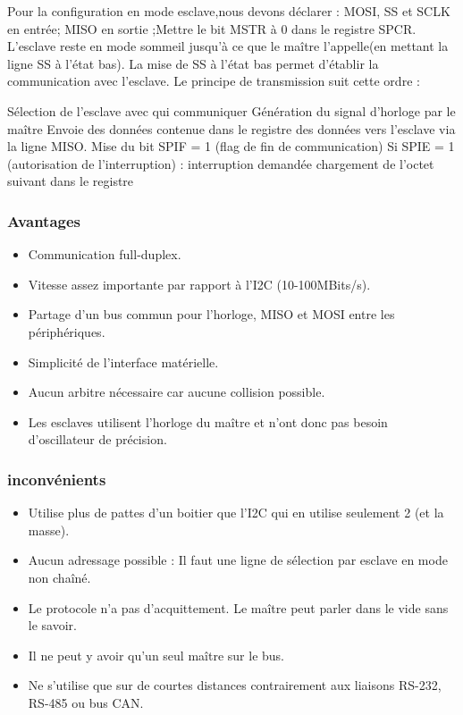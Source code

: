 \documentclass[french,a4paper,12pt]{report}
\begin{document}
  		Pour la configuration en mode esclave,nous devons déclarer : MOSI, SS et SCLK en entrée; MISO en sortie ;Mettre le bit MSTR à 0 dans le registre SPCR. L’esclave reste en mode sommeil jusqu’à ce que le maître l'appelle(en mettant la ligne SS à l’état bas). La mise de SS à l’état bas permet d'établir la communication avec l’esclave. Le principe de transmission suit cette ordre :
 
    Sélection de l'esclave avec qui communiquer
    Génération du signal d'horloge par le maître
    Envoie des données contenue dans le registre des données vers l’esclave via la ligne MISO.
    Mise du bit SPIF = 1 (flag de fin de communication)
    Si SPIE = 1 (autorisation de l’interruption) :
        interruption demandée
        chargement de l’octet suivant dans le registre

			\subsubsection{Avantages}
 
			\begin{itemize}
			\item Communication full-duplex.
			\item Vitesse assez importante par rapport à l’I2C (10-100MBits/s).
			\item Partage d’un bus commun pour l’horloge, MISO et MOSI entre les périphériques.
			\item Simplicité de l’interface matérielle.
			\item Aucun arbitre nécessaire car aucune collision possible.
			\item Les esclaves utilisent l’horloge du maître et n’ont donc pas besoin d’oscillateur de précision.
			\end{itemize}
 
  		\subsubsection{inconvénients}
 
			\begin{itemize}
			\item Utilise plus de pattes d’un boitier que l’I2C qui en utilise seulement 2 (et la masse).
			\item Aucun adressage possible : Il faut une ligne de sélection par esclave en mode non chaîné.
			\item Le protocole n’a pas d’acquittement. Le maître peut parler dans le vide sans le savoir.
			\item Il ne peut y avoir qu’un seul maître sur le bus.
			\item Ne s’utilise que sur de courtes distances contrairement aux liaisons RS-232, RS-485 ou bus CAN.
			\end{itemize}
 
\end{document}
